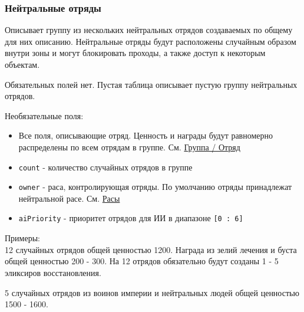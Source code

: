 \subsubsection{Нейтральные отряды}
\label{neutralStacks}
Описывает группу из нескольких нейтральных отрядов создаваемых по общему для них описанию.
Нейтральные отряды будут расположены случайным образом внутри зоны и могут блокировать проходы, а также доступ к некоторым объектам.

Обязательных полей нет. Пустая таблица описывает пустую группу нейтральных отрядов.

Необязательные поля:
\begin{itemize}
\item Все поля, описывающие отряд. Ценность и награды будут равномерно распределены по всем отрядам в группе. См. \hyperref[group]{Группа / Отряд}
\item \texttt{count} - количество случайных отрядов в группе
\item \texttt{owner} - раса, контролирующая отряды. По умолчанию отряды принадлежат нейтральной расе. См. \hyperref[raceTypes]{Расы}
\item \texttt{aiPriority} - приоритет отрядов для ИИ в диапазоне \texttt{[0 : 6]}
\end{itemize}

Примеры:\\
12 случайных отрядов общей ценностью 1200.
Награда из зелий лечения и буста общей ценностью 200 - 300.
На 12 отрядов обязательно будут созданы  1 - 5 эликсиров восстановления.

\begin{figure}[H]

\end{figure}

5 случайных отрядов из воинов империи и нейтральных людей общей ценностью 1500 - 1600.

\begin{figure}[H]

\end{figure}
